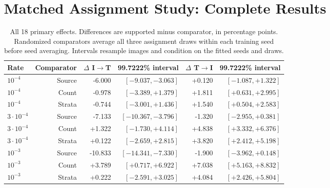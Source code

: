 \section{Matched Assignment Study: Complete Results}\label{app:furesults}
\begin{table}[t]
\nolinenumbers
\centering
\small
\setlength{\tabcolsep}{3pt}
\begin{tabular}{lrrrrr}
\toprule
Rate & Comparator & $\Delta$ I$\to$T & 99.7222\% interval & $\Delta$ T$\to$I & 99.7222\% interval\\
\midrule
$10^{-4}$ & Source & -6.000 & $[-9.037,-3.063]$ & +0.120 & $[-1.087,+1.322]$\\
$10^{-4}$ & Count & -0.978 & $[-3.389,+1.379]$ & +1.811 & $[+0.631,+2.995]$\\
$10^{-4}$ & Strata & -0.744 & $[-3.001,+1.436]$ & +1.540 & $[+0.504,+2.583]$\\
$3\cdot10^{-4}$ & Source & -7.133 & $[-10.367,-3.796]$ & -1.320 & $[-2.955,+0.381]$\\
$3\cdot10^{-4}$ & Count & +1.322 & $[-1.730,+4.114]$ & +4.838 & $[+3.332,+6.376]$\\
$3\cdot10^{-4}$ & Strata & +0.122 & $[-2.659,+2.815]$ & +3.820 & $[+2.412,+5.198]$\\
$10^{-3}$ & Source & -10.833 & $[-14.341,-7.330]$ & -1.900 & $[-3.962,+0.148]$\\
$10^{-3}$ & Count & +3.789 & $[+0.717,+6.922]$ & +7.038 & $[+5.163,+8.832]$\\
$10^{-3}$ & Strata & +0.222 & $[-2.591,+3.025]$ & +4.084 & $[+2.426,+5.804]$\\
\bottomrule
\end{tabular}
\caption{All 18 primary effects. Differences are supported minus comparator, in percentage points. Randomized comparators average all three assignment draws within each training seed before seed averaging. Intervals resample images and condition on the fitted seeds and draws.}\label{tab:fuprimary}
\end{table}
